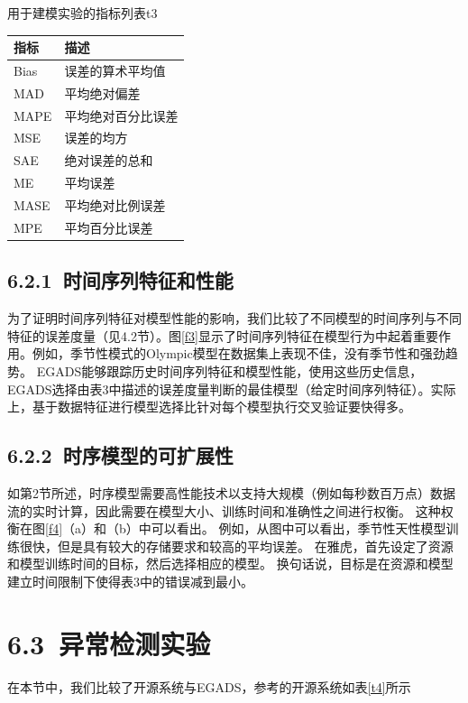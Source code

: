 \documentclass[a4paper,AutoFakeBold,oneside,12pt]{book}
\begin{document}
\begin{bupttable}{用于建模实验的指标列表}{t3}
    \begin{tabular}{l|l}
		\hline \textbf{指标} & \textbf{描述} \\
		\hline Bias & 误差的算术平均值 \\
		\hline MAD & 平均绝对偏差  \\
		\hline MAPE & 平均绝对百分比误差  \\
		\hline MSE & 误差的均方\\
		\hline SAE & 绝对误差的总和  \\
		\hline ME & 平均误差  \\
		\hline MASE & 平均绝对比例误差  \\
		\hline MPE & 平均百分比误差  \\
		\hline
    \end{tabular}
\end{bupttable}

\subsection*{6.2.1\ 时间序列特征和性能}
为了证明时间序列特征对模型性能的影响，我们比较了不同模型的时间序列与不同特征的误差度量（见4.2节）。图\ref{f3}显示了时间序列特征在模型行为中起着重要作用。例如，季节性模式的Olympic模型在数据集上表现不佳，没有季节性和强劲趋势。 EGADS能够跟踪历史时间序列特征和模型性能，使用这些历史信息，EGADS选择由表3中描述的误差度量判断的最佳模型（给定时间序列特征）。实际上，基于数据特征进行模型选择比针对每个模型执行交叉验证要快得多。


\subsection*{6.2.2\ 时序模型的可扩展性}
如第2节所述，时序模型需要高性能技术以支持大规模（例如每秒数百万点）数据流的实时计算，因此需要在模型大小、训练时间和准确性之间进行权衡。 这种权衡在图\ref{f4}（a）和（b）中可以看出。 例如，从图中可以看出，季节性天性模型训练很快，但是具有较大的存储要求和较高的平均误差。 在雅虎，首先设定了资源和模型训练时间的目标，然后选择相应的模型。 换句话说，目标是在资源和模型建立时间限制下使得表3中的错误减到最小。


\section*{6.3\ 异常检测实验}
在本节中，我们比较了开源系统与EGADS，参考的开源系统如表\ref{t4}所示
\end{document}

